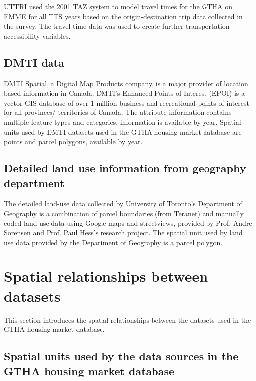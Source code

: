 UTTRI used the 2001 TAZ system to model travel times for the GTHA on EMME for all TTS years based on the origin-destination trip data collected in the survey.
The travel time data was used to create further transportation accessibility variables.

\subsection{DMTI data} \label{subsec:dmti_data}

DMTI Spatial, a Digital Map Products company, is a major provider of location based information in Canada.
DMTI's Enhanced Points of Interest (EPOI) is a vector GIS database of over 1 million business and recreational points of interest for all provinces/ territories of Canada.
The attribute information contains multiple feature types and categories, information is available by year.
Spatial units used by DMTI datasets used in the GTHA housing market database are points and parcel polygons, available by year.

\subsection{Detailed land use information from geography department} \label{subsec:detailed_land_use_from_geogrpahy_department}

The detailed land-use data collected by University of Toronto's Department of Geography is a combination of parcel boundaries (from Teranet) and manually coded land-use data using Google maps and streetviews, provided by Prof.
Andre Sorensen and Prof.
Paul Hess's research project.
The spatial unit used by land use data provided by the Department of Geography is a parcel polygon.

\section{Spatial relationships between datasets} \label{sec:spatial_relationships}

This section introduces the spatial relationships between the datasets used in the GTHA housing market database.


\subsection{Spatial units used by the data sources in the GTHA housing market database} \label{subsec:spatial_units_used_in_database}

